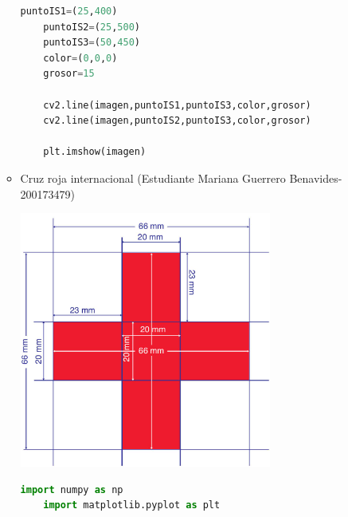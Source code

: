 \begin{enumerate}
\begin{itemize}
\begin{lstlisting}[language=Python]
    puntoIS1=(25,400)
    puntoIS2=(25,500)
    puntoIS3=(50,450)
    color=(0,0,0)
    grosor=15
    
    cv2.line(imagen,puntoIS1,puntoIS3,color,grosor)
    cv2.line(imagen,puntoIS2,puntoIS3,color,grosor)
    
    plt.imshow(imagen)
    \end{lstlisting}
    \item Cruz roja internacional (Estudiante Mariana Guerrero Benavides-200173479)
    \begin{center}
    \includegraphics[]{figures/Logo cruz roja.png}
    \end{center}
    \begin{lstlisting}[language=Python]
    import numpy as np
    import matplotlib.pyplot as plt
    

\end{lstlisting}
\end{itemize}
\end{enumerate}
